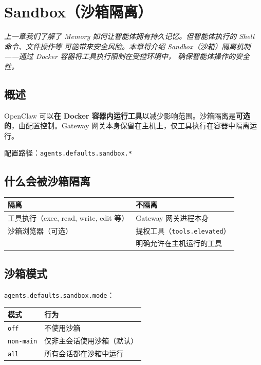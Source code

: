 \chapter{Sandbox（沙箱隔离）}

\vspace{0.5em}
\noindent\textit{上一章我们了解了 Memory 如何让智能体拥有持久记忆。但智能体执行的 Shell 命令、文件操作等
可能带来安全风险。本章将介绍 Sandbox（沙箱）隔离机制——通过 Docker 容器将工具执行限制在受控环境中，
确保智能体操作的安全性。}
\vspace{0.5em}

\section{概述}

OpenClaw 可以\textbf{在 Docker 容器内运行工具}以减少影响范围。沙箱隔离是\textbf{可选的}，由配置控制。Gateway 网关本身保留在主机上，仅工具执行在容器中隔离运行。

配置路径：\texttt{agents.defaults.sandbox.*}

\section{什么会被沙箱隔离}

\begin{center}
\begin{tabular}{ll}
\toprule
\textbf{隔离} & \textbf{不隔离} \\
\midrule
工具执行（exec, read, write, edit 等） & Gateway 网关进程本身 \\
沙箱浏览器（可选） & 提权工具（\texttt{tools.elevated}） \\
 & 明确允许在主机运行的工具 \\
\bottomrule
\end{tabular}
\end{center}

\section{沙箱模式}

\texttt{agents.defaults.sandbox.mode}：

\begin{center}
\begin{tabular}{ll}
\toprule
\textbf{模式} & \textbf{行为} \\
\midrule
\texttt{off} & 不使用沙箱 \\
\texttt{non-main} & 仅非主会话使用沙箱（默认） \\
\texttt{all} & 所有会话都在沙箱中运行 \\
\bottomrule
\end{tabular}
\end{center}

